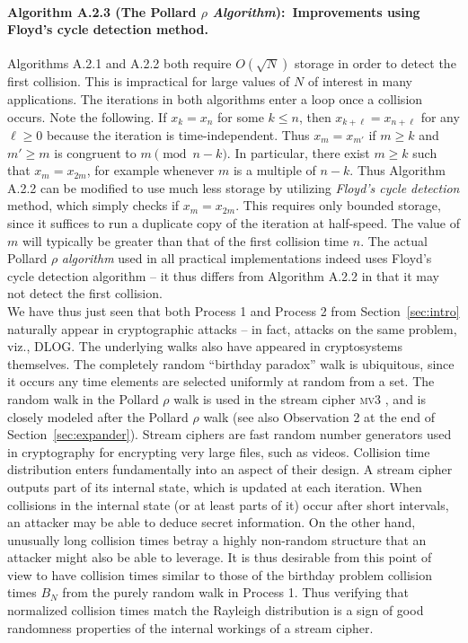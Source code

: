 \documentclass{llncs}
\newcommand{\secref}[1]{Section~\ref{#1}}
\numberwithin{equation}{section}
\renewcommand\({\left(}
\renewcommand\){\right)}
\begin{document}
\paragraph{\bf Algorithm A.2.3 (The Pollard $\rho$  \textbf{\textit{Algorithm}}):~Improvements using Floyd's cycle detection method.}
Algorithms A.2.1 and A.2.2 both require $O(\sqrt{N})$ storage in order to detect the first collision.  This is impractical for   large values of $N$ of   interest  in many applications.
The iterations in both algorithms enter  a loop once a collision occurs.  Note the following. If $x_k=x_n$ for some $k\le n$, then $x_{k+\ell}=x_{n+\ell}$ for any $\ell \ge 0$ because the iteration  is time-independent.  Thus $x_m=x_{m'}$ if $m\ge k$ and $m'\ge m$ is congruent to $m \pmod{n-k}$.  In particular, there exist $m\ge k$ such that $x_m=x_{2m}$, for example whenever $m$ is a multiple of $n-k$.  Thus Algorithm A.2.2 can be modified to use  much less storage by utilizing
 {\it
Floyd's  cycle detection} method, which simply checks if  $x_m=x_{2m}$. This requires only bounded storage, since it suffices to    run a duplicate copy of the iteration at half-speed.  The value of $m$ will typically be greater than that of the first collision time $n$.  The actual Pollard $\rho$ {\em algorithm} used in all practical implementations indeed uses Floyd's cycle detection algorithm -- it thus differs from Algorithm A.2.2 in that it may not detect the first collision.
\\





We have thus just seen that both Process 1 and Process 2 from \secref{sec:intro} naturally appear  in cryptographic attacks -- in fact, attacks on the same problem, viz., DLOG.  The underlying walks also have appeared in cryptosystems themselves.  The completely random ``birthday paradox'' walk is ubiquitous, since it occurs any time elements are selected uniformly at random from a set.
 The random walk in the Pollard $\rho$ walk is used in the stream cipher  \textsc{mv3}  \cite{KMMV}, and is closely modeled after the Pollard $\rho$ walk (see also Observation 2 at the end of \secref{sec:expander}).  Stream ciphers are fast random number generators used in cryptography for encrypting very large files, such as videos.  Collision time
 distribution enters  fundamentally into an aspect of their design.  A stream cipher outputs part of its internal state, which is updated at each iteration.  When collisions in the internal state (or at least parts of it) occur after short intervals, an attacker may be able to deduce secret information.  On the other hand,  unusually long collision times betray a highly non-random structure that an attacker might also be able to leverage.  It is thus desirable from this point of view to have collision times similar to those of the birthday problem collision times $B_N$  from the purely random walk in Process 1.  Thus verifying that normalized collision times match the Rayleigh distribution is a sign of good randomness properties of the internal workings of a stream cipher.
\end{document}
